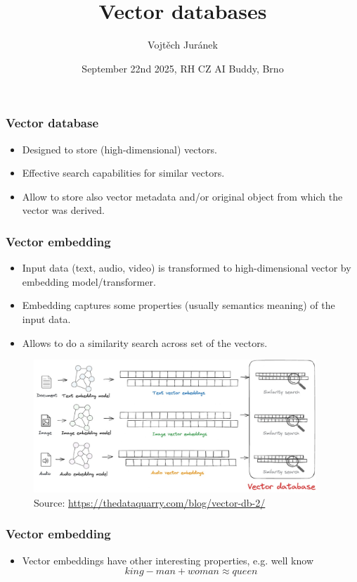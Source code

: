 \documentclass[10pt,utf8]{beamer}
\title{Vector databases}
\author{Vojtěch Juránek}
\institute[IBM]{IBM}
\date{September 22nd 2025, RH CZ AI Buddy, Brno}
\begin{document}
\begin{frame}
    \titlepage
\end{frame}

\begin{frame}
    \frametitle{Vector database}
    \begin{itemize}
        \item Designed to store (high-dimensional) vectors.
        \item Effective search capabilities for similar vectors.
        \item Allow to store also vector metadata and/or original object from which the vector was derived.
    \end{itemize}
\end{frame}

\begin{frame}
    \frametitle{Vector embedding}
    \begin{itemize}
        \item Input data (text, audio, video) is transformed to high-dimensional vector by embedding model/transformer.
        \item Embedding captures some properties (usually semantics meaning) of the input data.
        \item Allows to do a similarity search across set of the vectors.
    \end{itemize}
    
    \vspace{0.1cm}
    
    \begin{figure}
        \centering
        \includegraphics[height=5cm]{./img/media_to_db.eps}
        \caption{\tiny{Source: \url{https://thedataquarry.com/blog/vector-db-2/}}}
    \end{figure}
\end{frame}

\begin{frame}
    \frametitle{Vector embedding}
    \begin{itemize}
        \item Vector embeddings have other interesting properties, e.g. well know 
        \begin{equation}
            king - man + woman \approx queen
        \end{equation}
    \end{itemize}
\end{frame}
\end{document}
